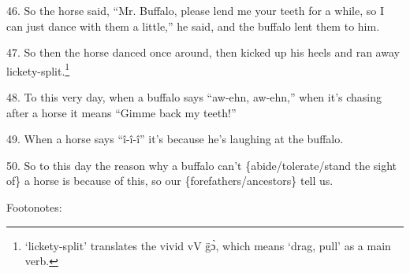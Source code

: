46. So the horse said, ``Mr. Buffalo, please lend me your teeth for a while, so
I can just dance with them a little,'' he said, and the buffalo lent them to him.

47. So then the horse danced once around, then kicked up his heels and ran away
lickety-split.\footnote{`lickety-split' translates the vivid vV g̈ɔ̀, which means `drag, pull' as a main verb.}

48. To this very day, when a buffalo says ``aw-ehn, aw-ehn,'' when it's chasing
after a horse it means ``Gimme back my teeth!''

49. When a horse says ``î-î-î'' it's because he's laughing at the buffalo.

50. So to this day the reason why a buffalo can't \{abide/tolerate/stand the sight
of\} a horse is because of this, so our \{forefathers/ancestors\} tell us.

Footonotes:

